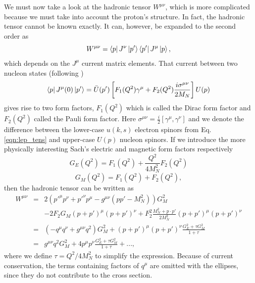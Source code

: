 We must now take a look at the hadronic tensor $W^{\mu\nu}$, which is more complicated because we must take into account the proton's structure. In fact, the hadronic tensor cannot be known exactly. It can, however, be expanded to the second order as
\begin{equation}
W^{\mu\nu} = \bra{p}J^{\nu}\ket{p'}\bra{p'}J^{\mu}\ket{p},
\end{equation}
which depends on the $J^{\mu}$ current matrix elements. That current between two nucleon states (following \cite{book:halzen})
\begin{equation}
\bra{p}J^{\mu}(0)\ket{p'} = \bar{U}(p')\left[ F_1(Q^2)\gamma^{\mu}+F_2(Q^2)\frac{i\sigma^{\mu\nu}}{2M_N} \right]U(p)
\end{equation}
gives rise to two form factors, $F_1(Q^2)$ which is called the Dirac form factor and $F_2(Q^2)$ called the Pauli form factor. Here $\sigma^{\mu\nu}=\tfrac{i}{2}[\gamma^{\mu},\gamma^{\nu}]$ and we denote the difference between the lower-case $u(k,s)$ electron spinors from Eq. \ref{eqn:lep_tens} and upper-case $U(p)$ nucleon spinors. If we introduce the more physically interesting Sach's electric and magnetic form factors respectively
\begin{equation}
\nonumber
G_E(Q^2) = F_1(Q^2) + \frac{Q^2}{4M_N^2} F_2(Q^2)
\end{equation}
\begin{equation}
\nonumber
G_M(Q^2) = F_1(Q^2) + F_2(Q^2),
\end{equation}
then the hadronic tensor can be written as
\begin{eqnarray}
\nonumber
W^{\mu\nu} &=& 2(p'^{\mu}p^{\nu} + p'^{\nu}p^{\mu} - g^{\mu\nu}(pp'-M_N^2))G_M^2 \\
\nonumber
&&- 2F_2G_M(p+p')^{\mu}(p+p')^{\nu}+F_2^2\frac{M_N^2+p \cdot p'}{2M_N^2}(p+p')^{\mu}(p+p')^{\nu} \\
\nonumber
&=& (-q^{\mu}q^{\nu}+g^{\mu\nu}q^2)G_M^2+(p+p')^{\mu}(p+p')^{\nu}\frac{G_E^2+\tau G_M^2}{1+\tau} \\
&=& g^{\mu\nu}q^2G_M^2+4p^{\mu}p^{\nu}\frac{G_E^2+\tau G_M^2}{1+\tau} + ...,
\end{eqnarray} 
where we define $\tau = Q^2/4M_N^2$ to simplify the expression. Because of current conservation, the terms containing factors of $q^{\mu}$ are omitted with the ellipses, since they do not contribute to the cross section.

